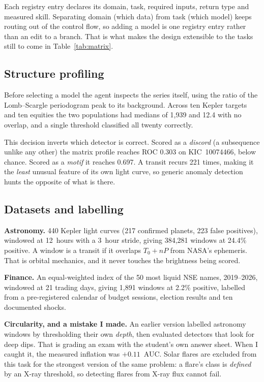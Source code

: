 \documentclass[11pt,a4paper]{article}
\begin{document}
Each registry entry declares its domain, task, required inputs, return type and
measured skill. Separating domain (which data) from task (which model) keeps
routing out of the control flow, so adding a model is one registry entry rather
than an edit to a branch. That is what makes the design extensible to the tasks
still to come in Table~\ref{tab:matrix}.

\subsection{Structure profiling}
Before selecting a model the agent inspects the series itself, using the ratio
of the Lomb--Scargle periodogram peak to its background. Across ten Kepler
targets and ten equities the two populations had medians of 1{,}939 and 12.4
with no overlap, and a single threshold classified all twenty correctly.

This decision inverts which detector is correct. Scored as a \emph{discord} (a
subsequence unlike any other) the matrix profile reaches ROC 0.303 on
KIC~10074466, below chance. Scored as a \emph{motif} it reaches 0.697. A
transit recurs 221 times, making it the \emph{least} unusual feature of its own
light curve, so generic anomaly detection hunts the opposite of what is there.

\subsection{Datasets and labelling}
\textbf{Astronomy.} 440 Kepler light curves (217 confirmed planets, 223 false
positives), windowed at 12~hours with a 3~hour stride, giving 384{,}281 windows
at 24.4\% positive. A window is a transit if it overlaps $T_0 + nP$ from NASA's
ephemeris. That is orbital mechanics, and it never touches the brightness being
scored.

\textbf{Finance.} An equal-weighted index of the 50 most liquid NSE names,
2019--2026, windowed at 21 trading days, giving 1{,}891 windows at 2.2\%
positive, labelled from a pre-registered calendar of budget sessions, election
results and ten documented shocks.

\textbf{Circularity, and a mistake I made.} An earlier version labelled
astronomy windows by thresholding their own \emph{depth}, then evaluated
detectors that look for deep dips. That is grading an exam with the student's
own answer sheet. When I caught it, the measured inflation was $+0.11$~AUC.
Solar flares are excluded from this task for the strongest version of the same
problem: a flare's class is \emph{defined} by an X-ray threshold, so detecting
flares from X-ray flux cannot fail.
\end{document}
